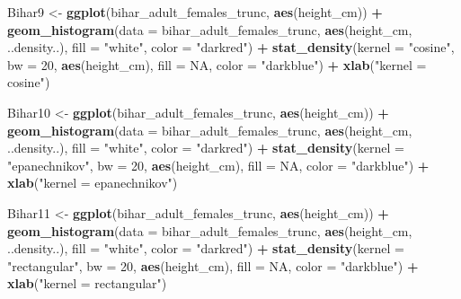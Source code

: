 \documentclass[]{book}
\newenvironment{Shaded}{\begin{snugshade}}{\end{snugshade}}
\newcommand{\KeywordTok}[1]{\textcolor[rgb]{0.13,0.29,0.53}{\textbf{#1}}}
\newcommand{\DataTypeTok}[1]{\textcolor[rgb]{0.13,0.29,0.53}{#1}}
\newcommand{\DecValTok}[1]{\textcolor[rgb]{0.00,0.00,0.81}{#1}}
\newcommand{\StringTok}[1]{\textcolor[rgb]{0.31,0.60,0.02}{#1}}
\newcommand{\OtherTok}[1]{\textcolor[rgb]{0.56,0.35,0.01}{#1}}
\newcommand{\OperatorTok}[1]{\textcolor[rgb]{0.81,0.36,0.00}{\textbf{#1}}}
\newcommand{\NormalTok}[1]{#1}
\theoremstyle{definition}
\theoremstyle{definition}
\theoremstyle{definition}
\theoremstyle{remark}
\begin{document}
\begin{Shaded}
\begin{Highlighting}[]
\NormalTok{Bihar9 <-}\StringTok{ }\KeywordTok{ggplot}\NormalTok{(bihar_adult_females_trunc, }\KeywordTok{aes}\NormalTok{(height_cm)) }\OperatorTok{+}\StringTok{ }
\StringTok{  }\KeywordTok{geom_histogram}\NormalTok{(}\DataTypeTok{data =}\NormalTok{ bihar_adult_females_trunc, }\KeywordTok{aes}\NormalTok{(height_cm, ..density..), }\DataTypeTok{fill =} \StringTok{"white"}\NormalTok{, }\DataTypeTok{color =} \StringTok{"darkred"}\NormalTok{) }\OperatorTok{+}
\StringTok{  }\KeywordTok{stat_density}\NormalTok{(}\DataTypeTok{kernel =} \StringTok{"cosine"}\NormalTok{, }\DataTypeTok{bw =} \DecValTok{20}\NormalTok{, }\KeywordTok{aes}\NormalTok{(height_cm), }\DataTypeTok{fill =} \OtherTok{NA}\NormalTok{, }\DataTypeTok{color =} \StringTok{"darkblue"}\NormalTok{) }\OperatorTok{+}
\StringTok{  }\KeywordTok{xlab}\NormalTok{(}\StringTok{"kernel = cosine"}\NormalTok{)}

\NormalTok{Bihar10 <-}\StringTok{ }\KeywordTok{ggplot}\NormalTok{(bihar_adult_females_trunc, }\KeywordTok{aes}\NormalTok{(height_cm)) }\OperatorTok{+}\StringTok{ }
\StringTok{  }\KeywordTok{geom_histogram}\NormalTok{(}\DataTypeTok{data =}\NormalTok{ bihar_adult_females_trunc, }\KeywordTok{aes}\NormalTok{(height_cm, ..density..), }\DataTypeTok{fill =} \StringTok{"white"}\NormalTok{, }\DataTypeTok{color =} \StringTok{"darkred"}\NormalTok{) }\OperatorTok{+}
\StringTok{  }\KeywordTok{stat_density}\NormalTok{(}\DataTypeTok{kernel =} \StringTok{"epanechnikov"}\NormalTok{, }\DataTypeTok{bw =} \DecValTok{20}\NormalTok{, }\KeywordTok{aes}\NormalTok{(height_cm), }\DataTypeTok{fill =} \OtherTok{NA}\NormalTok{, }\DataTypeTok{color =} \StringTok{"darkblue"}\NormalTok{) }\OperatorTok{+}
\StringTok{  }\KeywordTok{xlab}\NormalTok{(}\StringTok{"kernel = epanechnikov"}\NormalTok{)}

\NormalTok{Bihar11 <-}\StringTok{ }\KeywordTok{ggplot}\NormalTok{(bihar_adult_females_trunc, }\KeywordTok{aes}\NormalTok{(height_cm)) }\OperatorTok{+}\StringTok{ }
\StringTok{  }\KeywordTok{geom_histogram}\NormalTok{(}\DataTypeTok{data =}\NormalTok{ bihar_adult_females_trunc, }\KeywordTok{aes}\NormalTok{(height_cm, ..density..), }\DataTypeTok{fill =} \StringTok{"white"}\NormalTok{, }\DataTypeTok{color =} \StringTok{"darkred"}\NormalTok{) }\OperatorTok{+}
\StringTok{  }\KeywordTok{stat_density}\NormalTok{(}\DataTypeTok{kernel =} \StringTok{"rectangular"}\NormalTok{, }\DataTypeTok{bw =} \DecValTok{20}\NormalTok{, }\KeywordTok{aes}\NormalTok{(height_cm), }\DataTypeTok{fill =} \OtherTok{NA}\NormalTok{, }\DataTypeTok{color =} \StringTok{"darkblue"}\NormalTok{) }\OperatorTok{+}
\StringTok{  }\KeywordTok{xlab}\NormalTok{(}\StringTok{"kernel = rectangular"}\NormalTok{)}


\end{Highlighting}
\end{Shaded}
\end{document}
